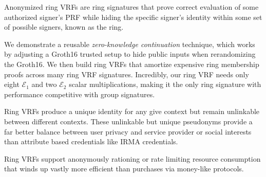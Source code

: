 \def\eprintsmallskip{\smallskip}{}%
%
Anonymized ring VRFs are ring signatures that prove correct evaluation
of some authorized signer's PRF while hiding the specific signer's
identity within some set of possible signers, known as the ring.

\eprintsmallskip
We demonstrate a reusable {\em zero-knowledge continuation} technique,
which works by adjusting a Groth16 trusted setup to hide public inputs
when rerandomizing the Groth16.  We then build ring VRFs that amortize
expensive ring membership proofs across many ring VRF signatures.
%
Incredibly, our ring VRF needs only eight $\mathcal{E}_1$ and two
$\mathcal{E}_2$ scalar multiplications, making it the only ring signature
with performance competitive with group signatures.

\eprintsmallskip
Ring VRFs produce a unique identity for any give context but remain
unlinkable between different contexts.  These unlinkable but unique
pseudonyms provide a far better balance between user privacy and service
provider or social interests than attribute based credentials like IRMA credentials.

\eprintsmallskip
Ring VRFs support anonymously rationing or rate limiting resource
consumption that winds up vastly more efficient than purchases via money-like protocols.

